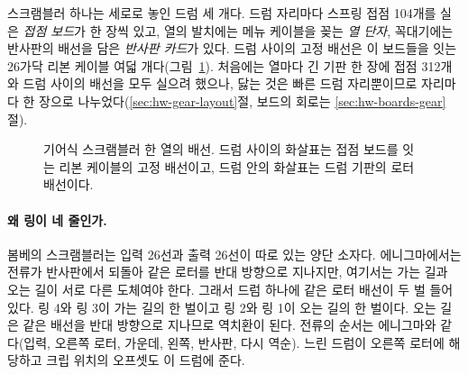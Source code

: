 스크램블러 하나는 세로로 놓인 드럼 세 개다. 드럼 자리마다 스프링 접점 104개를 실은 \emph{접점 보드}가 한 장씩
있고, 열의 발치에는 메뉴 케이블을 꽂는 \emph{열 단자}, 꼭대기에는 반사판의 배선을 담은 \emph{반사판 카드}가 있다.
드럼 사이의 고정 배선은 이 보드들을 잇는 26가닥 리본 케이블 여덟 개다(그림~\ref{fig:hw-gear-chain}). 처음에는 열마다
긴 기판 한 장에 접점 312개와 드럼 사이의 배선을 모두 실으려 했으나, 닳는 것은 빠른 드럼 자리뿐이므로 자리마다 한
장으로 나누었다(\ref{sec:hw-gear-layout}절, 보드의 회로는 \ref{sec:hw-boards-gear}절).

\begin{figure}[ht]
\centering
{}
\caption{기어식 스크램블러 한 열의 배선. 드럼 사이의 화살표는 접점 보드를 잇는 리본 케이블의 고정 배선이고, 드럼
안의 화살표는 드럼 기판의 로터 배선이다.}
\label{fig:hw-gear-chain}
\end{figure}

\paragraph{왜 링이 네 줄인가.} 봄베의 스크램블러는 입력 26선과 출력 26선이 따로 있는 양단 소자다. 에니그마에서는
전류가 반사판에서 되돌아 같은 로터를 반대 방향으로 지나지만, 여기서는 가는 길과 오는 길이 서로 다른
도체여야 한다. 그래서 드럼 하나에 같은 로터 배선이 두 벌 들어 있다. 링 4와 링 3이 가는 길의 한 벌이고
링 2와 링 1이 오는 길의 한 벌이다. 오는 길은 같은 배선을 반대 방향으로 지나므로 역치환이 된다. 전류의 순서는
에니그마와 같다(입력, 오른쪽 로터, 가운데, 왼쪽, 반사판, 다시 역순). 느린 드럼이 오른쪽 로터에 해당하고
크립 위치의 오프셋도 이 드럼에 준다.


